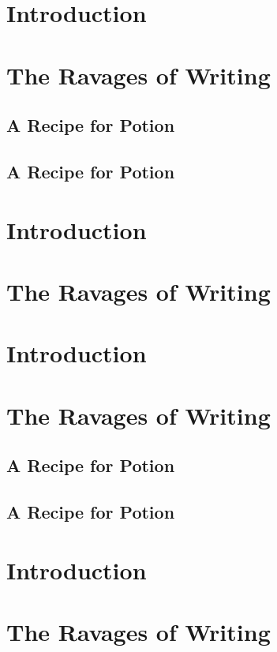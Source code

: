 \section*{Introduction}
\hypertarget{_introduction}{}
\section*{The Ravages of Writing}
\hypertarget{_the_ravages_of_writing}{\subsection*{A Recipe for Potion}}
\subsection*{A Recipe for Potion}
\hypertarget{_a_recipe_for_potion}{}

\section*{Introduction}
\hypertarget{_introduction}{}
\section*{The Ravages of Writing}
\hypertarget{_the_ravages_of_writing}{}

\section*{Introduction}
\hypertarget{_introduction}{}
\section*{The Ravages of Writing}
\hypertarget{_the_ravages_of_writing}{\subsection*{A Recipe for Potion}}
\subsection*{A Recipe for Potion}
\hypertarget{_a_recipe_for_potion}{}

\section*{Introduction}
\hypertarget{_introduction}{}
\section*{The Ravages of Writing}
\hypertarget{_the_ravages_of_writing}{}
